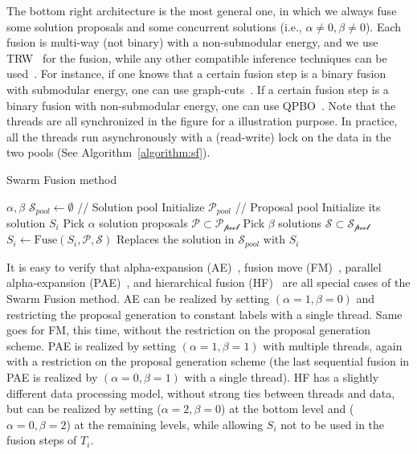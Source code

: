 %
The bottom right architecture is the most general one, in which we
always fuse some solution proposals and some concurrent solutions (i.e.,
$\alpha\ne 0, \beta \ne 0$).
%
Each fusion is multi-way (not binary) with a non-submodular energy, and
we use TRW~\cite{kolmogorov} for the fusion, while any other compatible
inference techniques can be used~\cite{opengm}. For instance, if one
knows that a certain fusion step is a binary fusion with submodular
energy, one can use graph-cuts~\cite{alpha_expansion_paper}. If a
certain fusion step is a binary fusion with non-submodular energy, one
can use QPBO~\cite{second_order_smoothness_stereo}.
%
Note that the threads are all synchronized in the figure for a
illustration purpose. In practice, all the threads run asynchronously
with a (read-write) lock on the data in the two pools (See Algorithm~\ref{algorithm:sf}).
%
%
%
\begin{algorithm}
 \caption{Swarm Fusion method}
 \label{algorithm:sf}
 \begin{algorithmic}
  \Procedure{} {$\alpha, \beta$}
  \State $\mathcal{S}_{pool} \leftarrow \emptyset$ //
  Solution pool
  \State Initialize $\mathcal{P}_{pool}$ // Proposal pool
  \State Initialize its solution $S_i$
  \EndFor
  \State
  \State Pick $\alpha$ solution proposals $\mathcal{P}\subset \mathcal{P_{\mbox{pool}}}$
  \State Pick $\beta$ solutions $\mathcal{S} \subset \mathcal{S_{\mbox{pool}}}$
  \State $S_i \leftarrow \mbox{Fuse}(S_i, \mathcal{P}, \mathcal{S})$
  \State Replaces the solution in $\mathcal{S}_{pool}$ with $S_i$
  \EndFor
  \EndProcedure
 \end{algorithmic}
\end{algorithm}



\noindent It is easy to verify that alpha-expansion
(AE)~\cite{alpha_expansion}, fusion move (FM)~\cite{viktor}, parallel
alpha-expansion (PAE)~\cite{delong}, and hierarchical fusion
(HF)~\cite{delong_hierarchical,olga} are all special cases of the Swarm
Fusion method. AE can be realized by setting $(\alpha=1, \beta=0)$ and
restricting the proposal generation to constant labels with a single
thread. Same goes for FM, this time, without the restriction on the
proposal generation scheme. PAE is realized by setting
$(\alpha=1,\beta=1)$ with multiple threads, again with a restriction on
the proposal generation scheme (the last sequential fusion in PAE is
realized by $(\alpha=0, \beta=1)$ with a single thread).
%
HF has a slightly different data processing model, without strong ties
between threads and data, but can be realized by setting ($\alpha=2,
\beta=0$) at the bottom level and ($\alpha=0, \beta=2$) at the remaining
levels, while allowing $S_i$ not to be used in the fusion steps of
$T_i$.


